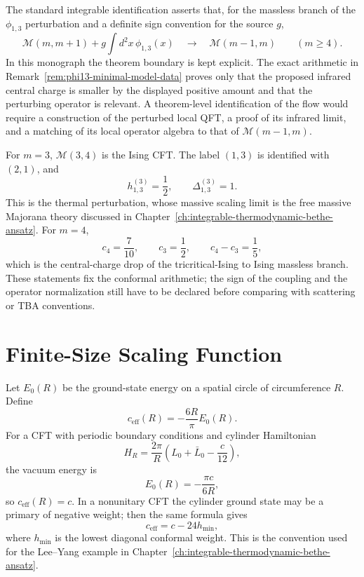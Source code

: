 The standard integrable identification asserts that, for the massless branch
of the \(\phi_{1,3}\) perturbation and a definite sign convention for the
source \(g\),
\[
  \mathcal M(m,m+1)
  +g\int d^2x\,\phi_{1,3}(x)
  \quad\longrightarrow\quad
  \mathcal M(m-1,m)
  \qquad (m\ge4).
\]
In this monograph the theorem boundary is kept explicit.  The exact
arithmetic in Remark~\ref{rem:phi13-minimal-model-data} proves only
that the proposed infrared central charge is smaller by the displayed
positive amount and that the perturbing operator is relevant.  A theorem-level
identification of the flow would require a construction of the perturbed
local QFT, a proof of its infrared limit, and a matching of its local operator
algebra to that of \(\mathcal M(m-1,m)\).

\begin{example}
\label{ex:first-phi13-minimal-flows}
For \(m=3\), \(\mathcal M(3,4)\) is the Ising CFT.  The label
\((1,3)\) is identified with \((2,1)\), and
\[
  h_{1,3}^{(3)}=\frac12,\qquad \Delta_{1,3}^{(3)}=1.
\]
This is the thermal perturbation, whose massive scaling limit is the free
massive Majorana theory discussed in
Chapter~\ref{ch:integrable-thermodynamic-bethe-ansatz}.  For \(m=4\),
\[
  c_4=\frac{7}{10},\qquad c_3=\frac12,\qquad c_4-c_3=\frac15,
\]
which is the central-charge drop of the tricritical-Ising to Ising massless
branch.  These statements fix the conformal arithmetic; the sign of the
coupling and the operator normalization still have to be declared before
comparing with scattering or TBA conventions.
\end{example}

\section{Finite-Size Scaling Function}

Let \(E_0(R)\) be the ground-state energy on a spatial circle of
circumference \(R\).  Define
\[
  c_{\mathrm{eff}}(R)
  =
  -\frac{6R}{\pi}E_0(R).
\]
For a CFT with periodic boundary conditions and cylinder Hamiltonian
\[
  H_R=\frac{2\pi}{R}\left(L_0+\bar L_0-\frac{c}{12}\right),
\]
the vacuum energy is
\[
  E_0(R)=-\frac{\pi c}{6R},
\]
so \(c_{\mathrm{eff}}(R)=c\).  In a nonunitary CFT the cylinder ground state
may be a primary of negative weight; then the same formula gives
\[
  c_{\mathrm{eff}}=c-24h_{\min},
\]
where \(h_{\min}\) is the lowest diagonal conformal weight.  This is the
convention used for the Lee--Yang example in
Chapter~\ref{ch:integrable-thermodynamic-bethe-ansatz}.

